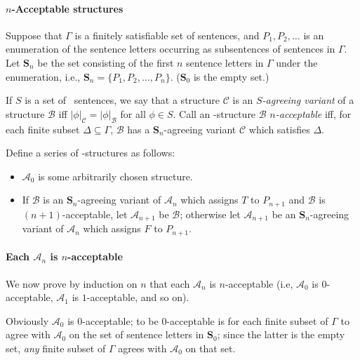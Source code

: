 \paragraph{$n$-Acceptable structures}
Suppose that $\Gamma$ is a finitely satisfiable set of sentences, and $P_{1},P_{2},\ldots$ is an enumeration of the sentence letters occurring as subsentences of sentences in $\Gamma$. Let $\mathbf{S}_{n}$ be the set consisting of the first $n$ sentence letters in $\Gamma$ under the enumeration, i.e., $\mathbf{S}_{n} = \{P_{1},P_{2},\ldots,P_{n}\}$. ($\mathbf{S}_{0}$ is the empty set.)
    
     If $S$ is a set of \lone\ sentences, we say that a structure $\mathscr{C}$ is an \emph{$S$-agreeing variant} of a structure $\mathscr{B}$ iff $|\phi|_{\mathscr{C}}=|\phi|_{\mathscr{B}}$ for all $\phi \in S$.
    Call an \lone-structure $\mathscr{B}$ \emph{$n$-acceptable} iff, for each finite subset $\Delta \subseteq \Gamma$, $\mathscr{B}$ has a $\mathbf{S}_{n}$-agreeing variant $\mathscr{C}$ which satisfies $\Delta$.


Define a series of \lone-structures as follows: \begin{itemize}
      \item $\mathscr{A}_{0}$ is some arbitrarily chosen structure.
      \item If $\mathscr{B}$ is an $\mathbf{S}_{n}$-agreeing variant of $\mathscr{A}_{n}$ which assigns $T$ to $P_{n+1}$ and $\mathscr{B}$ is $(n+1)$-acceptable, let $\mathscr{A}_{n+1}$ be $\mathscr{B}$; otherwise let $\mathscr{A}_{n+1}$ be an $\mathbf{S}_{n}$-agreeing variant of $\mathscr{A}_{n}$ which assigns $F$ to $P_{n+1}$.
    \end{itemize} 
    
  \paragraph{Each $\mathscr{A}_{n}$ is $n$-acceptable}  
    
We now prove by induction on $n$ that each $\mathscr{A}_{n}$ is $n$-acceptable (i.e, $\mathscr{A}_{0}$ is $0$-acceptable, $\mathscr{A}_{1}$ is $1$-acceptable, and so on). 

Obviously $\mathscr{A}_{0}$ is $0$-acceptable; to be $0$-acceptable is for each finite subset of $\Gamma$ to agree with $\mathscr{A}_{0}$ on the set of sentence letters in $\mathbf{S}_{0}$; since the latter is the empty set, \emph{any} finite subset of $\Gamma$ agrees with $\mathscr{A}_{0}$ on that set.

